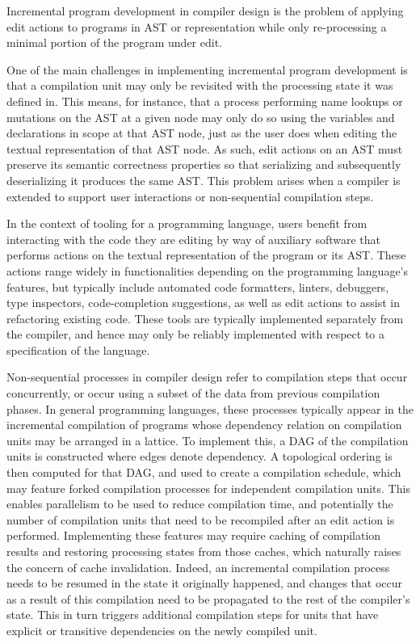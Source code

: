 Incremental program development in compiler design is the problem of applying edit actions to programs in \ac{AST} or representation while only re-processing a minimal portion of the program under edit.

One of the main challenges in implementing incremental program development is that a compilation unit may only be revisited with the processing state it was defined in.
This means, for instance, that a process performing name lookups or mutations on the \ac{AST} at a given node may only do so using the variables and declarations in scope at that \ac{AST} node, just as the user does when editing the textual representation of that \ac{AST} node.
As such, edit actions on an \ac{AST} must preserve its semantic correctness properties so that serializing and subsequently deserializing it produces the same \ac{AST}.
This problem arises when a compiler is extended to support user interactions or non-sequential compilation steps.

In the context of tooling for a programming language, users benefit from interacting with the code they are editing by way of auxiliary software that performs actions on the textual representation of the program or its \ac{AST}.
These actions range widely in functionalities depending on the programming language's features, but typically include automated code formatters, linters, debuggers, type inspectors, code-completion suggestions, as well as edit actions to assist in refactoring existing code.
These tools are typically implemented separately from the compiler, and hence may only be reliably implemented with respect to a specification of the language.

Non-sequential processes in compiler design refer to compilation steps that occur concurrently, or occur using a subset of the data from previous compilation phases.
In general programming languages, these processes typically appear in the incremental compilation of programs whose dependency relation on compilation units may be arranged in a lattice.
To implement this, a \ac{DAG} of the compilation units is constructed where edges denote dependency.
A topological ordering is then computed for that \ac{DAG}, and used to create a compilation schedule, which may feature forked compilation processes for independent compilation units.
This enables parallelism to be used to reduce compilation time, and potentially the number of compilation units that need to be recompiled after an edit action is performed.
Implementing these features may require caching of compilation results and restoring processing states from those caches, which naturally raises the concern of cache invalidation.
Indeed, an incremental compilation process needs to be resumed in the state it originally happened, and changes that occur as a result of this compilation need to be propagated to the rest of the compiler's state.
This in turn triggers additional compilation steps for units that have explicit or transitive dependencies on the newly compiled unit.

